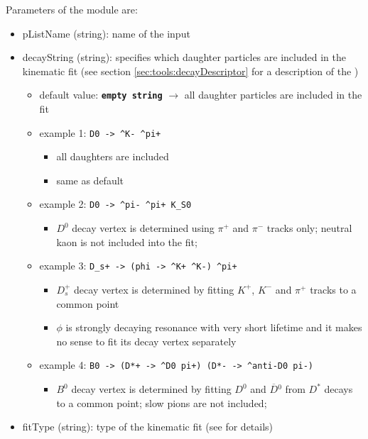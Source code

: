 Parameters of the \pVertexFitter module are:
\begin{itemize}
 \item {\bluett pListName} (string): name of the input \pList 
 \item {\bluett decayString} (string): specifies which daughter particles are included in the kinematic fit (see 
 section \ref{sec:tools:decayDescriptor} for a description of the \decayString)
 \begin{itemize}
  \item default value: {\color{red}\tt \bf empty string} $\rightarrow$ all daughter particles are included in the fit
  \item example 1: {\color{red}\tt D0 -> \string^K- \string^pi+}
  \begin{itemize}
   \item all daughters are included 
   \item same as default
  \end{itemize}
  \item example 2: {\color{red}\tt D0 -> \string^pi- \string^pi+ K\_S0}
  \begin{itemize}
   \item $D^0$ decay vertex is determined using $\pi^+$ and $\pi^-$ tracks only; neutral kaon is not included into the fit;
  \end{itemize}
  \item example 3: {\color{red}\tt  D\_s+ -> (phi -> \string^K+ \string^K-) \string^pi+}
  \begin{itemize}
   \item $D_s^+$ decay vertex is determined by fitting $K^+$, $K^-$ and $\pi^+$ tracks to a common point
   \item $\phi$ is strongly decaying resonance with very short lifetime and it makes no sense to fit its decay vertex separately
  \end{itemize}
  \item example 4: {\color{red}\tt  B0 -> (D*+ -> \string^D0 pi+) (D*- -> \string^anti-D0 pi-)}
  \begin{itemize}
   \item $B^0$ decay vertex is determined by fitting $D^0$ and $\overline{D}{}^0$ from $D^{\ast}$ decays to a common point; slow pions 
         are not included;
  \end{itemize}
 \end{itemize}
 \item {\bluett fitType} (string): type of the kinematic fit (see \cite{fitters} for details)

\end{itemize}
